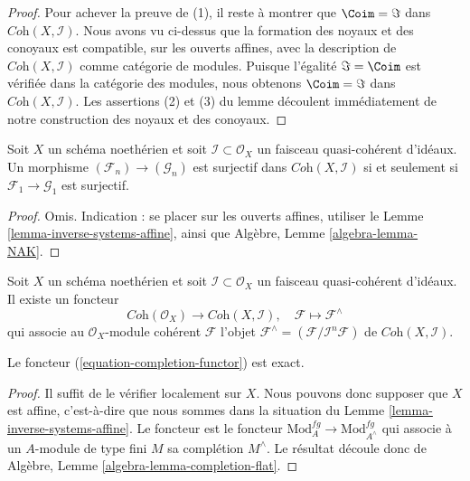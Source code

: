 \begin{proof}
\medskip\noindent
Pour achever la preuve de (1), il reste à montrer que $\Coim = \Im$
dans $\textit{Coh}(X, \mathcal{I})$. Nous avons vu ci-dessus que la formation
des noyaux et des conoyaux est compatible, sur les ouverts affines, avec la description
de $\textit{Coh}(X, \mathcal{I})$ comme catégorie de modules. Puisque
l'égalité $\Im = \Coim$ est vérifiée dans la catégorie des modules,
nous obtenons $\Coim = \Im$ dans $\textit{Coh}(X, \mathcal{I})$.
Les assertions (2) et (3) du lemme découlent immédiatement de notre construction
des noyaux et des conoyaux.
\end{proof}

\begin{lemma}
\label{lemma-inverse-systems-surjective}
Soit $X$ un schéma noethérien et soit $\mathcal{I} \subset \mathcal{O}_X$
un faisceau quasi-cohérent d'idéaux. Un morphisme
$(\mathcal{F}_n) \to (\mathcal{G}_n)$ est surjectif dans
$\textit{Coh}(X, \mathcal{I})$
si et seulement si $\mathcal{F}_1 \to \mathcal{G}_1$ est surjectif.
\end{lemma}

\begin{proof}
Omis. Indication : se placer sur les ouverts affines, utiliser le
Lemme \ref{lemma-inverse-systems-affine}, ainsi que
Algèbre, Lemme \ref{algebra-lemma-NAK}.
\end{proof}

\noindent
Soit $X$ un schéma noethérien et soit $\mathcal{I} \subset \mathcal{O}_X$
un faisceau quasi-cohérent d'idéaux. Il existe un foncteur
\begin{equation}
\label{equation-completion-functor}
\textit{Coh}(\mathcal{O}_X) \longrightarrow \textit{Coh}(X, \mathcal{I}), \quad
\mathcal{F} \longmapsto \mathcal{F}^\wedge
\end{equation}
qui associe au $\mathcal{O}_X$-module cohérent $\mathcal{F}$
l'objet $\mathcal{F}^\wedge = (\mathcal{F}/\mathcal{I}^n\mathcal{F})$
de $\textit{Coh}(X, \mathcal{I})$.

\begin{lemma}
\label{lemma-exact}
Le foncteur (\ref{equation-completion-functor}) est exact.
\end{lemma}

\begin{proof}
Il suffit de le vérifier localement sur $X$. Nous pouvons donc supposer que $X$
est affine, c'est-à-dire que nous sommes dans la situation du
Lemme \ref{lemma-inverse-systems-affine}.
Le foncteur est le foncteur $\text{Mod}^{fg}_A \to \text{Mod}^{fg}_{A^\wedge}$
qui associe à un $A$-module de type fini $M$ sa complétion $M^\wedge$.
Le résultat découle donc de
Algèbre, Lemme \ref{algebra-lemma-completion-flat}.
\end{proof}

